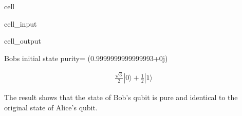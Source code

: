 \documentclass[letterpaper,10pt,english]{jupyterBook}
\begin{document}
\begin{sphinxuseclass}{cell}\begin{sphinxVerbatimInput}

\begin{sphinxuseclass}{cell_input}
\begin{sphinxVerbatim}[commandchars=\\\{\}]
   \PYG{p}{[}\PYG{p}{]}
  
\end{sphinxVerbatim}

\end{sphinxuseclass}\end{sphinxVerbatimInput}
\begin{sphinxVerbatimOutput}

\begin{sphinxuseclass}{cell_output}
\begin{sphinxVerbatim}[commandchars=\\\{\}]
Bob\PYGZsq{}s initial state
purity= (0.9999999999999993+0j)
\end{sphinxVerbatim}
\begin{equation*}
\begin{split}\frac{\sqrt{3}}{2} |0\rangle+\frac{1}{2} |1\rangle\end{split}
\end{equation*}
\end{sphinxuseclass}\end{sphinxVerbatimOutput}

\end{sphinxuseclass}
\sphinxAtStartPar
The result shows that the state of Bob’s qubit is pure and identical to the original state of Alice’s qubit.
\end{document}
